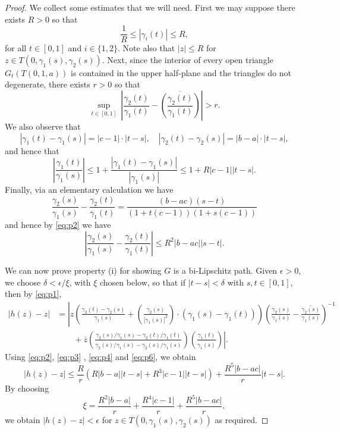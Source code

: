 \documentclass{amsart}
\begin{document}
\begin{proof}
We collect some estimates that we will need. First we may suppose there exists $R>0$ so that 
\begin{equation}
\label{eq:p2}
\frac{1}{R} \leq | \gamma_i(t)| \leq R,
\end{equation}
for all $t\in [0,1]$ and $i\in \{1,2\}$.
Note also that $|z| \leq R$ for $z\in T(0,\gamma_1(s), \gamma_2(s))$.
Next, since the interior of every open triangle $G_t(T(0,1,a))$ is contained in the upper half-plane and the triangles do not degenerate, there exists $r>0$ so that
\begin{equation}
\label{eq:p3}
\sup_{t\in [0,1]} \ \left |\frac{\gamma_2(t)}{\gamma_1(t)} - \overline{ \left ( \frac{ \gamma_2(t)}{\gamma_1(t) } \right ) } \right | >r .
\end{equation}
We also observe that
\begin{equation}
\label{eq:p4}
|\gamma_1(t) - \gamma_1(s)| = |c-1| \cdot |t-s| , \quad |\gamma_2(t) - \gamma_2(s) | = |b-a| \cdot |t-s |,
\end{equation}
and hence that
\begin{equation}
\label{eq:p4a}
 \left | \frac{ \gamma_1(t) }{\gamma_1(s) } \right | \leq 1 + \frac{ |\gamma_1(t) - \gamma_1(s)| }{|\gamma_1(s)|} \leq 1+ R|c-1| |t-s|.
\end{equation}
Finally, via an elementary calculation we have
\[ \frac{ \gamma_2(s) }{ \gamma_1(s)} - \frac{\gamma_2(t)}{\gamma_1(t) } = \frac{(b-ac)(s-t)}{ (1+t(c-1))(1+s(c-1) )}\]
and hence by \eqref{eq:p2} we have
\begin{equation}
\label{eq:p6}
\left | \frac{ \gamma_2(s) }{ \gamma_1(s)} - \frac{\gamma_2(t)}{\gamma_1(t) }  \right | \leq R^2 |b-ac|  |s-t|.
\end{equation}


We can now prove property (i) for showing $G$ is a bi-Lipschitz path. Given $\epsilon >0$, we choose $\delta <  \epsilon / \xi$, with $\xi$ chosen below, so that if $|t-s| <\delta$ with $s,t \in [0,1]$, then by \eqref{eq:p1},
\begin{align*}
|h(z) - z| &= \left | z \left ( \frac{ \gamma_2(t) - \gamma_2(s) }{\gamma_1(s)} + \left ( \frac{\overline{\gamma_2(s) }}{|\gamma_1(s) |^2} \right ) \cdot \left (  \gamma_1(s) - \gamma_1(t)  \right ) \right ) \left (  \frac{\gamma_2(s)}{\gamma_1(s)} - \overline{\frac{\gamma_2(s)}{\gamma_1(s)} } \right )^{-1} \right .\\
&\qquad+ \left . \overline{z} \left ( \frac{ \gamma_2(s) / \gamma_1(s) - \gamma_2(t) / \gamma_1(t)  }{ \gamma_2(s) / \gamma_1(s) - \overline{ \gamma_2(s) / \gamma_1(s) } } \right  ) \left ( \frac{ \gamma_1(t) }{\overline{\gamma_1(s)}} \right ) \right |.
\end{align*}
Using \eqref{eq:p2}, \eqref{eq:p3} , \eqref{eq:p4} and \eqref{eq:p6}, we obtain
\[ |h(z)-z| \leq \frac{R}{r} \left (  R|b-a| |t-s| +  R^3|c-1| |t-s| \right ) + \frac{R^5|b-ac|}{r} |t-s|.\] 
By choosing 
\[ \xi = \frac{R^2 |b-a|}{r} + \frac{R^4 |c-1|}{r} + \frac{R^5|b-ac|}{r},\]
we obtain $|h(z) - z| <\epsilon$ for $z\in T(0,\gamma_1(s) , \gamma_2(s))$ as required.


\end{proof}
\end{document}
